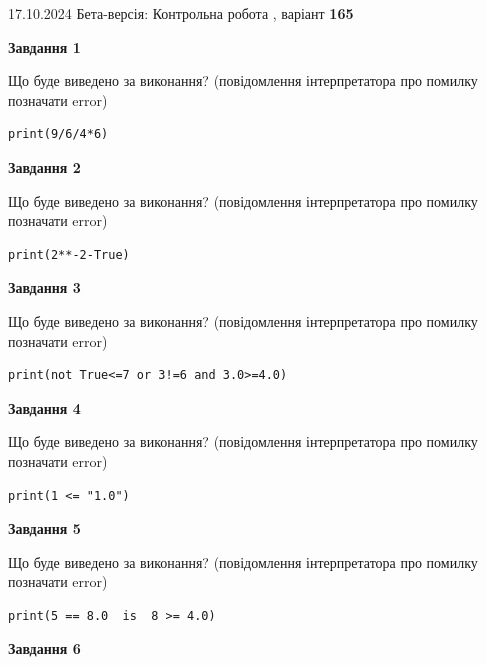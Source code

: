 \documentclass[12pt, ukrainian]{article}
\begin{document}
{\Large{17.10.2024 Бета-версія: Контрольна робота , варіант  \No \textbf { 165 }\par}}
{
\begin {large}
{\begin {center}\textbf{Завдання 1}\end {center}}

Що буде виведено за виконання? (повідомлення інтерпретатора про помилку позначати error)\par
\begin{verbatim}
print(9/6/4*6)
\end{verbatim}

{\begin {center}\textbf{Завдання 2}\end {center}}

Що буде виведено за виконання? (повідомлення інтерпретатора про помилку позначати error)\par
\begin{verbatim}
print(2**-2-True)
\end{verbatim}

{\begin {center}\textbf{Завдання 3}\end {center}}

Що буде виведено за виконання? (повідомлення інтерпретатора про помилку позначати error)\par
\begin{verbatim}
print(not True<=7 or 3!=6 and 3.0>=4.0)
\end{verbatim}

{\begin {center}\textbf{Завдання 4}\end {center}}

Що буде виведено за виконання? (повідомлення інтерпретатора про помилку позначати error)\par
\begin{verbatim}
print(1 <= "1.0")
\end{verbatim}

{\begin {center}\textbf{Завдання 5}\end {center}}

Що буде виведено за виконання? (повідомлення інтерпретатора про помилку позначати error)\par
\begin{verbatim}
print(5 == 8.0  is  8 >= 4.0)
\end{verbatim}

{\begin {center}\textbf{Завдання 6}\end {center}}


\end{large}}
\end{document}
